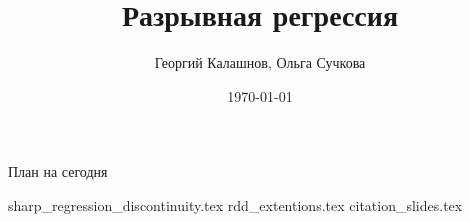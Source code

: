 \title{Разрывная регрессия}
\author[Георгий Калашнов, Ольга Сучкова]{Георгий Калашнов, Ольга Сучкова}
\date{\today}



\begin{frame}
  \titlepage
  
\end{frame}



\begin{frame}{План на сегодня} 
\tableofcontents
\end{frame}

{sharp_regression_discontinuity.tex}
{rdd_extentions.tex}
{citation_slides.tex}





